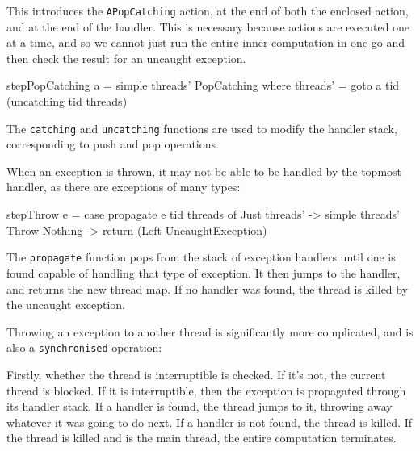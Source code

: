 This introduces the \verb|APopCatching| action, at the end of both the
enclosed action, and at the end of the handler. This is necessary
because actions are executed one at a time, and so we cannot just run
the entire inner computation in one go and then check the result for
an uncaught exception.

\begin{haskellcode}
stepPopCatching a = simple threads' PopCatching where
  threads' = goto a tid (uncatching tid threads)
\end{haskellcode}

The \verb|catching| and \verb|uncatching| functions are used to modify
the handler stack, corresponding to push and pop operations.

When an exception is thrown, it may not be able to be handled by the
topmost handler, as there are exceptions of many types:

\begin{haskellcode}
stepThrow e = case propagate e tid threads of
    Just threads' -> simple threads' Throw
    Nothing -> return (Left UncaughtException)
\end{haskellcode}

The \verb|propagate| function pops from the stack of exception
handlers until one is found capable of handling that type of
exception. It then jumps to the handler, and returns the new thread
map. If no handler was found, the thread is killed by the uncaught
exception.

Throwing an exception to another thread is significantly more
complicated, and is also a \verb|synchronised| operation:


Firstly, whether the thread is interruptible is checked. If it's not,
the current thread is blocked. If it is interruptible, then the
exception is propagated through its handler stack. If a handler is
found, the thread jumps to it, throwing away whatever it was going to
do next. If a handler is not found, the thread is killed. If the
thread is killed and is the main thread, the entire computation
terminates.

